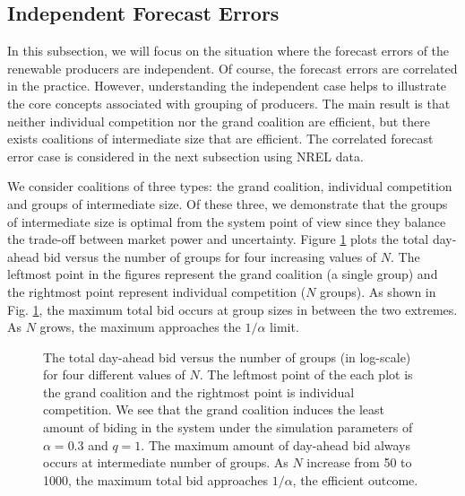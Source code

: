 \documentclass[journal]{IEEEtran}
\begin{document}
\subsection{Independent Forecast Errors} \label{sec:iid}
In this subsection, we will focus on the situation where the forecast errors of the renewable producers are independent. Of course, the forecast errors are correlated in the practice. However, understanding the independent case helps to illustrate the core concepts associated with grouping of producers. The main result is that neither individual competition nor the grand coalition are efficient, but there exists coalitions of intermediate size that are efficient.  The correlated forecast error case is considered in the next subsection using NREL data. 

We consider coalitions of three types: the grand coalition, individual competition and groups of intermediate size. Of these three, we demonstrate that the groups of intermediate size is optimal from the system point of view since they balance the trade-off between market power and uncertainty. Figure \ref{fig:N} plots the total day-ahead bid versus the number of groups for four increasing values of $N$.
The leftmost point in the figures represent the grand coalition (a single group) and the rightmost point represent individual competition ($N$ groups). As shown in Fig. \ref{fig:N}, the maximum total bid occurs at group sizes in between the two extremes. As $N$ grows, the maximum approaches the $1/\alpha$ limit. 
\begin{figure}[!t]
\hspace{-0.4cm}
\caption{The total day-ahead bid versus the number of groups (in log-scale) for four different values of $N$. The leftmost point of the each plot is the grand coalition and the rightmost point is individual competition. We see that the grand coalition induces the least amount of biding in the system under the simulation parameters of $\alpha=0.3$ and $q=1$. The maximum amount of day-ahead bid always occurs at intermediate number of groups. As $N$ increase from 50 to 1000, the maximum total bid approaches $1/\alpha$, the efficient outcome. }
\label{fig:N}
\end{figure}
\end{document}
